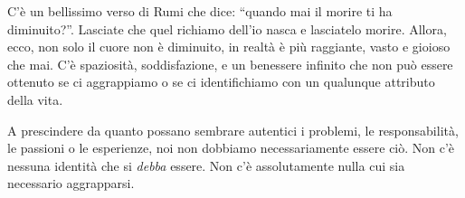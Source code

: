 C'è un bellissimo verso di Rumi che dice: ``quando mai il morire ti ha diminuito?''. Lasciate che quel richiamo dell'io nasca e lasciatelo morire. Allora, ecco, non solo il cuore non è diminuito, in realtà è più raggiante, vasto e gioioso che mai. C'è spaziosità, soddisfazione, e un benessere infinito che non può essere ottenuto se ci aggrappiamo o se ci identifichiamo con un qualunque attributo della vita.

A prescindere da quanto possano sembrare autentici i problemi, le responsabilità, le passioni o le esperienze, noi non dobbiamo necessariamente essere ciò. Non c'è nessuna identità che si \textit{debba} essere. Non c'è assolutamente nulla cui sia necessario aggrapparsi.

